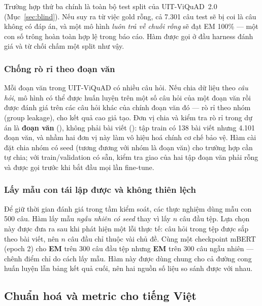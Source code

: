 Trường hợp thứ ba chính là toàn bộ test split của UIT-ViQuAD~2.0 (Mục~\ref{sec:blind}).
Nếu suy ra  từ việc gold rỗng, cả 7.301 câu test sẽ bị coi là câu
không có đáp án, và một mô hình \emph{luôn trả về chuỗi rỗng} sẽ đạt EM 100\% --- một con
số trông hoàn toàn hợp lệ trong báo cáo. Hàm  được gọi ở đầu
harness đánh giá và từ chối chấm một split như vậy.

\subsubsection{Chống rò rỉ theo đoạn văn}

Mỗi đoạn văn trong UIT-ViQuAD có nhiều câu hỏi. Nếu chia dữ liệu theo \emph{câu hỏi}, mô
hình có thể được huấn luyện trên một số câu hỏi của một đoạn văn rồi được đánh giá trên
các câu hỏi khác của chính đoạn văn đó --- rò rỉ theo nhóm (group leakage), cho kết quả
cao giả tạo. Đơn vị chia và kiểm tra rò rỉ trong dự án là \textbf{đoạn văn}
(), không phải bài viết (): tập train có 138 bài viết nhưng
4.101 đoạn văn, và nhầm hai đơn vị này làm vô hiệu hoá chính cơ chế bảo vệ. Hàm
 cài đặt chia nhóm có seed (tương đương 
với nhóm là đoạn văn) cho trường hợp cần tự chia; với train/validation có sẵn,
 kiểm tra giao của hai tập đoạn văn phải rỗng và được gọi trước
khi bắt đầu mọi lần fine-tune.

\subsubsection{Lấy mẫu con tái lập được và không thiên lệch}
\label{sec:subset}

Để giữ thời gian đánh giá trong tầm kiểm soát, các thực nghiệm dùng mẫu con 500 câu. Hàm
 lấy mẫu \emph{ngẫu nhiên có seed} thay vì
lấy $n$ câu đầu tệp. Lựa chọn này được đưa ra sau khi phát hiện một lỗi thực tế: câu hỏi
trong tệp được sắp theo bài viết, nên $n$ câu đầu chỉ thuộc vài chủ đề. Cùng một checkpoint
mBERT (epoch 2) cho \textbf{EM \curveMbertFirstEMII{}} trên 300 câu đầu tệp nhưng
\textbf{EM \curveMbertValEMII{}} trên 300 câu ngẫu nhiên --- chênh \curveMbertFirstGap{}
điểm chỉ do cách lấy mẫu. Hàm này được dùng chung cho cả
đường cong huấn luyện lẫn bảng kết quả cuối, nên hai nguồn số liệu so sánh được với nhau.

\subsection{Chuẩn hoá và metric cho tiếng Việt}
\label{sec:metric-design}

